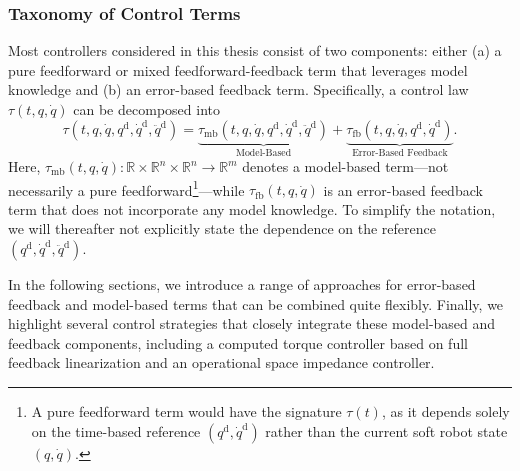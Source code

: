 \subsubsection{Taxonomy of Control Terms}
Most controllers considered in this thesis consist of two components: either (a) a pure feedforward or mixed feedforward-feedback term that leverages model knowledge and (b) an error-based feedback term. Specifically, a control law $\tau(t, q, \dot{q})$ can be decomposed into
\begin{equation}
    \tau(t, q, \dot{q}, q^\mathrm{d},\dot{q}^\mathrm{d},\ddot{q}^\mathrm{d}) = \underbrace{\tau_\mathrm{mb}(t, q, \dot{q}, q^\mathrm{d},\dot{q}^\mathrm{d},\ddot{q}^\mathrm{d})}_\text{Model-Based} + \underbrace{\tau_\mathrm{fb}(t, q, \dot{q}, q^\mathrm{d},\dot{q}^\mathrm{d})}_\text{Error-Based Feedback}.
\end{equation}
Here, $\tau_\mathrm{mb}(t, q, \dot{q}): \mathbb{R} \times \mathbb{R}^n \times \mathbb{R}^n \to \mathbb{R}^m$ denotes a model-based term—not necessarily a pure feedforward\footnote{A pure feedforward term would have the signature $\tau(t)$, as it depends solely on the time-based reference $(q^\mathrm{d},\dot{q}^\mathrm{d})$ rather than the current soft robot state $(q,\dot{q})$.}—while $\tau_\mathrm{fb}(t, q, \dot{q})$ is an error-based feedback term that does not incorporate any model knowledge. To simplify the notation, we will thereafter not explicitly state the dependence on the reference $(q^\mathrm{d},\dot{q}^\mathrm{d},\ddot{q}^\mathrm{d})$.

In the following sections, we introduce a range of approaches for error-based feedback and model-based terms that can be combined quite flexibly. Finally, we highlight several control strategies that closely integrate these model-based and feedback components, including a computed torque controller based on full feedback linearization and an operational space impedance controller.

